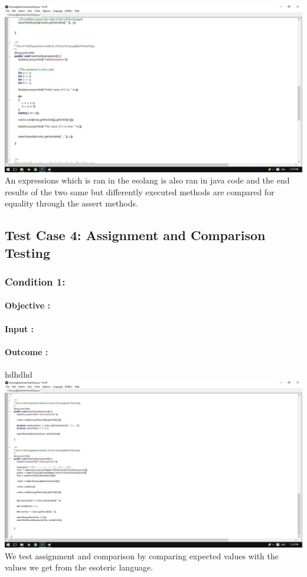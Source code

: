 \documentclass[english]{article}
\begin{document}
			\includegraphics[width=\linewidth]{test3.jpg}
			\\[12pt]		
			An expressions which is ran in the esolang is also ran in java code and the end results of the two same but differently executed methods are compared for equality through the assert methods. 	
			\subsection{Test Case 4: Assignment and Comparison Testing}
			\subsubsection{Condition 1: }
			\paragraph{Objective :}
			\paragraph{Input :}
			\paragraph{Outcome :}hdhdhd\\
			\includegraphics[width=\linewidth]{test4.jpg}
			\\[12pt]
			We test assignment and comparison by comparing expected values with the values we get from the esoteric language.	
	
\end{document}
